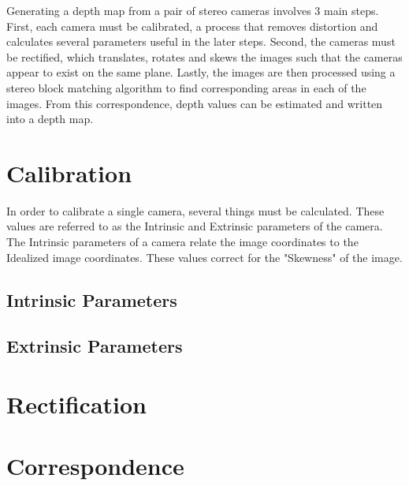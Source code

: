 Generating a depth map from a pair of stereo cameras involves 3 main steps.  First, each camera must be calibrated, a process that removes distortion and calculates several parameters useful in the later steps.  Second, the cameras must be rectified, which translates, rotates and skews the images such that the cameras appear to exist on the same plane.  Lastly, the images are then processed using a stereo block matching algorithm to find corresponding areas in each of the images.  From this correspondence, depth values can be estimated and written into a depth map.

\section{Calibration}
In order to calibrate a single camera, several things must be calculated.  These values are referred to as the Intrinsic and Extrinsic parameters of the camera.  The Intrinsic parameters of a camera relate the image coordinates to the Idealized image coordinates.  These values correct for the "Skewness" of the image.
\subsection{Intrinsic Parameters}
\subsection{Extrinsic Parameters}
\section{Rectification}

\section{Correspondence}